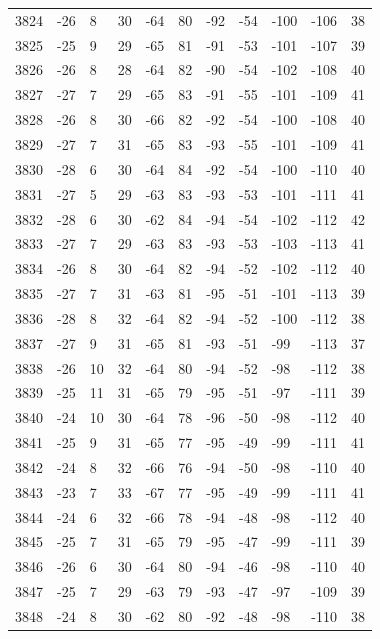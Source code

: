 \begin{table}[H]
\begin{tabular}{lllllllllll}
3824 & -26 & 8 & 30 & -64 & 80 & -92 & -54 & -100 & -106 & 38 \\
3825 & -25 & 9 & 29 & -65 & 81 & -91 & -53 & -101 & -107 & 39 \\
3826 & -26 & 8 & 28 & -64 & 82 & -90 & -54 & -102 & -108 & 40 \\
3827 & -27 & 7 & 29 & -65 & 83 & -91 & -55 & -101 & -109 & 41 \\
3828 & -26 & 8 & 30 & -66 & 82 & -92 & -54 & -100 & -108 & 40 \\
3829 & -27 & 7 & 31 & -65 & 83 & -93 & -55 & -101 & -109 & 41 \\
3830 & -28 & 6 & 30 & -64 & 84 & -92 & -54 & -100 & -110 & 40 \\
3831 & -27 & 5 & 29 & -63 & 83 & -93 & -53 & -101 & -111 & 41 \\
3832 & -28 & 6 & 30 & -62 & 84 & -94 & -54 & -102 & -112 & 42 \\
3833 & -27 & 7 & 29 & -63 & 83 & -93 & -53 & -103 & -113 & 41 \\
3834 & -26 & 8 & 30 & -64 & 82 & -94 & -52 & -102 & -112 & 40 \\
3835 & -27 & 7 & 31 & -63 & 81 & -95 & -51 & -101 & -113 & 39 \\
3836 & -28 & 8 & 32 & -64 & 82 & -94 & -52 & -100 & -112 & 38 \\
3837 & -27 & 9 & 31 & -65 & 81 & -93 & -51 & -99 & -113 & 37 \\
3838 & -26 & 10 & 32 & -64 & 80 & -94 & -52 & -98 & -112 & 38 \\
3839 & -25 & 11 & 31 & -65 & 79 & -95 & -51 & -97 & -111 & 39 \\
3840 & -24 & 10 & 30 & -64 & 78 & -96 & -50 & -98 & -112 & 40 \\
3841 & -25 & 9 & 31 & -65 & 77 & -95 & -49 & -99 & -111 & 41 \\
3842 & -24 & 8 & 32 & -66 & 76 & -94 & -50 & -98 & -110 & 40 \\
3843 & -23 & 7 & 33 & -67 & 77 & -95 & -49 & -99 & -111 & 41 \\
3844 & -24 & 6 & 32 & -66 & 78 & -94 & -48 & -98 & -112 & 40 \\
3845 & -25 & 7 & 31 & -65 & 79 & -95 & -47 & -99 & -111 & 39 \\
3846 & -26 & 6 & 30 & -64 & 80 & -94 & -46 & -98 & -110 & 40 \\
3847 & -25 & 7 & 29 & -63 & 79 & -93 & -47 & -97 & -109 & 39 \\
3848 & -24 & 8 & 30 & -62 & 80 & -92 & -48 & -98 & -110 & 38 \\

\end{tabular}
\end{table}
